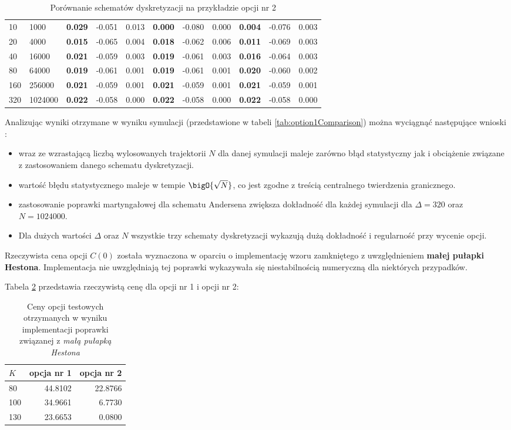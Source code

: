 \documentclass{pracamgr}
\begin{document}
\begin{table}[ht!]
{\begin{tabular}{l l| >{\bfseries}rrr @{\hskip 0.5in} >{\bfseries}rrr @{\hskip 0.5in} >{\bfseries}r r r}
\midrule
10 & 1000 & 0.029 & -0.051 & 0.013 & 0.000 & -0.080 & 0.000 & 0.004 & -0.076 & 0.003 \\
20 & 4000 & 0.015 & -0.065 & 0.004 & 0.018 & -0.062 & 0.006 & 0.011 & -0.069 & 0.003 \\
40 & 16000 & 0.021 & -0.059 & 0.003 & 0.019 & -0.061 & 0.003 & 0.016 & -0.064 & 0.003 \\
80 & 64000 & 0.019 & -0.061 & 0.001 & 0.019 & -0.061 & 0.001 & 0.020 & -0.060 & 0.002 \\
160 & 256000 & 0.021 & -0.059 & 0.001 & 0.021 & -0.059 & 0.001 & 0.021 & -0.059 & 0.001 \\
320 & 1024000 & 0.022 & -0.058 & 0.000 & 0.022 & -0.058 & 0.000 & 0.022 & -0.058 & 0.000 \\
\bottomrule
\end{tabular}
}
\caption{Porównanie schematów dyskretyzacji na przykładzie opcji nr 2}
\label{tab:option2Comparison}
\end{table}

Analizując wyniki otrzymane w wyniku symulacji (przedstawione w tabeli 
\ref{tab:option1Comparison}) można wyciągnąć następujące wnioski :
\begin{itemize}
  \item wraz ze wzrastającą liczbą wylosowanych trajektorii $N$ dla danej
  symulacji maleje zarówno błąd statystyczny jak i obciążenie związane z zastosowaniem 
  danego schematu dyskretyzacji. 
  \item wartość błędu statystycznego maleje w tempie $\bigO{\sqrt{N}}$, co jest
  zgodne z treścią centralnego twierdzenia granicznego.
  \item zastosowanie poprawki martyngałowej dla schematu Andersena zwiększa
  dokładność dla każdej symulacji dla $\Delta = 320$ oraz $N = 1024000$.
  \item Dla dużych wartości $\Delta$ oraz $N$ wszystkie trzy schematy dyskretyzacji 
  wykazują dużą dokładność i regularność przy wycenie opcji.
\end{itemize}
Rzeczywista cena opcji $C(0)$ została wyznaczona w oparciu o implementację
wzoru zamkniętego z uwzględnieniem \textbf{małej pułapki Hestona}.
Implementacja nie uwzględniają tej poprawki wykazywała się niestabilnością numeryczną 
dla niektórych przypadków. 

Tabela \ref{tab:littleTrapOption1Price} przedstawia rzeczywistą cenę dla
opcji nr 1 i opcji nr 2:
\begin{table}[htbp]
\centering 
\begin{tabular}{@{\hskip 0.5in}l |  @{\hskip 0.5in}r  @{\hskip 0.5in}r  }
\toprule
$K$ & opcja nr 1 & opcja nr 2\\
\midrule
80 & 44.8102 & 22.8766 \\
100 & 34.9661 & 6.7730 \\
130 & 23.6653 & 0.0800 \\
\bottomrule
\end{tabular}
\caption{Ceny opcji testowych otrzymanych w wyniku implementacji 
         poprawki związanej z \textit{małą pułapką Hestona}}
\label{tab:littleTrapOption1Price}
\end{table}
\end{document}
